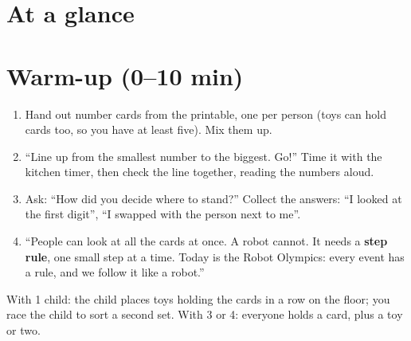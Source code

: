 \section{At a glance}
\begin{timeplan}
\end{timeplan}

\section{Warm-up (0--10 min)}
\begin{unplugged}
\begin{enumerate}[leftmargin=1.4em,itemsep=1pt]
  \item Hand out number cards from the printable, one per person (toys can hold cards too, so you have at least five). Mix them up.
  \item \enquote{Line up from the smallest number to the biggest. Go!} Time it with the kitchen timer, then check the line together, reading the numbers aloud.
  \item Ask: \enquote{How did you decide where to stand?} Collect the answers: \enquote{I looked at the first digit}, \enquote{I swapped with the person next to me}.
  \item \enquote{People can look at all the cards at once. A robot cannot. It needs a \textbf{step rule}, one small step at a time. Today is the Robot Olympics: every event has a rule, and we follow it like a robot.}
\end{enumerate}
With 1 child: the child places toys holding the cards in a row on the floor; you race the child to sort a second set. With 3 or 4: everyone holds a card, plus a toy or two.
\end{unplugged}

